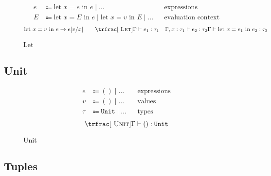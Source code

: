 \documentclass[nonacm]{acmart}
\newcommand{\unit}{\texttt{Unit}}
\begin{document}
\begin{figure}
  \begin{framed}
    \begin{align*}
      e & \Coloneqq \text{let } x = e \text{ in } e \mid \dots                                      &  & \text{expressions}        \\
      E & \Coloneqq \text{let } x = E \text{ in } e \mid \text{let } x = v \text{ in } E \mid \dots &  & \text{evaluation context}
    \end{align*}
    \[
      \text{let } x = v \text{ in } e \rightarrow e[v/x]
      \qquad
      \trfrac[~\textsc{Let}]{\Gamma \vdash e_1 : \tau_1 \quad \Gamma, x : \tau_1 \vdash e_2 : \tau_2}{\Gamma \vdash \text{let } x = e_1 \text{ in } e_2 : \tau_2}
    \]
  \end{framed}
  \caption{Let}\label{fig:let}
\end{figure}

\subsection{Unit}

\begin{figure}
  \begin{framed}
    \begin{align*}
      e    & \Coloneqq () \mid \dots    &  & \text{expressions} \\
      v    & \Coloneqq () \mid \dots    &  & \text{values}      \\
      \tau & \Coloneqq \unit \mid \dots &  & \text{types}
    \end{align*}
    \[
      \trfrac[~\textsc{Unit}]{}{\Gamma \vdash () : \unit}
    \]
  \end{framed}
  \caption{Unit}\label{fig:unit}
\end{figure}

\subsection{Tuples}
\end{document}
